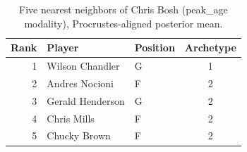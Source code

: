 \begin{table}[htbp]
  \centering\small
  \begin{tabular}{rllc}
    \toprule
    Rank & Player & Position & Archetype \\
    \midrule
    1 & Wilson Chandler & G & 1 \\
    2 & Andres Nocioni & F & 2 \\
    3 & Gerald Henderson & G & 2 \\
    4 & Chris Mills & F & 2 \\
    5 & Chucky Brown & F & 2 \\
    \bottomrule
  \end{tabular}
  \caption{Five nearest neighbors of Chris Bosh (peak_age modality), Procrustes-aligned posterior mean.}
  \label{tab:Chris_Bosh_neighbors_peak_age}
\end{table}

